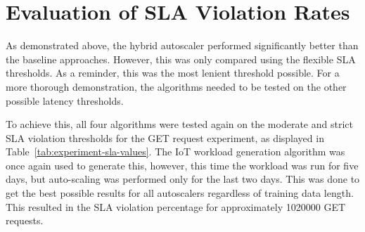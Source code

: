 \section{Evaluation of SLA Violation Rates}
\label{sec:ch6-sla-violation-eval}

As demonstrated above, the hybrid autoscaler performed significantly better than the baseline approaches. However, this was only compared using the flexible SLA thresholds. As a reminder, this was the most lenient threshold possible. For a more thorough demonstration, the algorithms needed to be tested on the other possible latency thresholds.\par

To achieve this, all four algorithms were tested again on the moderate and strict SLA violation thresholds for the GET request experiment, as displayed in Table~\ref{tab:experiment-sla-values}. The IoT workload generation algorithm was once again used to generate this, however, this time the workload was run for five days, but auto-scaling was performed only for the last two days. This was done to get the best possible results for all autoscalers regardless of training data length. This resulted in the SLA violation percentage for approximately \num[group-separator={,}]{1020000} GET requests.\par

